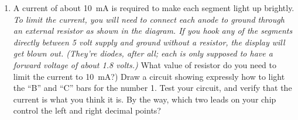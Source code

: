 \begin{enumerate}[wide]
\item A current of about 10~mA is required to make each segment light up brightly.  \textit{To limit the current, you will need to connect each anode to ground through an external resistor as shown in the diagram.  If you hook any of the segments directly between 5 volt supply and ground without a resistor, the display will get blown out.  (They're diodes, after all; each is only supposed to have a forward voltage of about 1.8 volts.)}  What value of resistor do you need to limit the current to 10~mA?)  Draw a circuit showing expressly how to light the ``B'' and ``C'' bars for the number 1.  Test your circuit, and verify that the current is what you think it is.  By the way, which two leads on your chip control the left and right decimal points? 

\end{enumerate}

